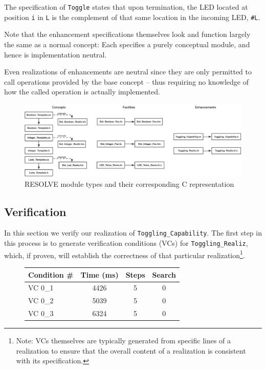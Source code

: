 \documentclass{sig-alternate}
\begin{document}
The specification of \texttt{Toggle} states that upon termination, the LED located at position \texttt{i} in \texttt{L} is the complement of that same location in the incoming LED, \texttt{\#L}.

Note that the enhancement specifications themselves look and function largely the same as a normal concept: Each specifies a purely conceptual module, and hence is implementation neutral. 

Even realizations of enhancements are neutral since they are only permitted to call operations provided by the base concept -- thus requiring no knowledge of how the called operation is actually implemented.

\begin{figure}[!htb]
\centering
\includegraphics[scale=.45]{figs/implementation.pdf}
\caption{RESOLVE module types and their corresponding C representation}
\end{figure}
\label{fig:imp}

\subsection{Verification}

In this section we verify our realization of \texttt{Toggling\_Capability}. The first step in this process is to generate verification conditions (VCs) for \texttt{Toggling\_Realiz}, which, if proven, will establish the correctness of that particular realization\footnote{Note: VCs themselves are typically generated from specific lines of a realization to ensure that the overall content of a realization is consistent with its specification.}.

\begin{figure}[!htb]
\centering
\begin{tabular}{lccc}
	\toprule
	Condition \# & Time (ms)	& Steps	& Search \\
	\midrule
	VC 0\_1	& 4426	& 5	& 0	\\
	VC 0\_2	& 5039	& 5	& 0	\\
	VC 0\_3	& 6324	& 5	& 0	\\
	\bottomrule
\end{tabular}
\end{figure}
\end{document}
